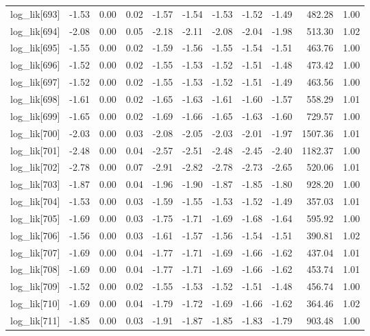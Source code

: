 \begin{table}[ht]
\begin{tabular}{rrrrrrrrrrr}
  log\_lik[693] & -1.53 & 0.00 & 0.02 & -1.57 & -1.54 & -1.53 & -1.52 & -1.49 & 482.28 & 1.00 \\ 
  log\_lik[694] & -2.08 & 0.00 & 0.05 & -2.18 & -2.11 & -2.08 & -2.04 & -1.98 & 513.30 & 1.02 \\ 
  log\_lik[695] & -1.55 & 0.00 & 0.02 & -1.59 & -1.56 & -1.55 & -1.54 & -1.51 & 463.76 & 1.00 \\ 
  log\_lik[696] & -1.52 & 0.00 & 0.02 & -1.55 & -1.53 & -1.52 & -1.51 & -1.48 & 473.42 & 1.00 \\ 
  log\_lik[697] & -1.52 & 0.00 & 0.02 & -1.55 & -1.53 & -1.52 & -1.51 & -1.49 & 463.56 & 1.00 \\ 
  log\_lik[698] & -1.61 & 0.00 & 0.02 & -1.65 & -1.63 & -1.61 & -1.60 & -1.57 & 558.29 & 1.01 \\ 
  log\_lik[699] & -1.65 & 0.00 & 0.02 & -1.69 & -1.66 & -1.65 & -1.63 & -1.60 & 729.57 & 1.00 \\ 
  log\_lik[700] & -2.03 & 0.00 & 0.03 & -2.08 & -2.05 & -2.03 & -2.01 & -1.97 & 1507.36 & 1.01 \\ 
  log\_lik[701] & -2.48 & 0.00 & 0.04 & -2.57 & -2.51 & -2.48 & -2.45 & -2.40 & 1182.37 & 1.00 \\ 
  log\_lik[702] & -2.78 & 0.00 & 0.07 & -2.91 & -2.82 & -2.78 & -2.73 & -2.65 & 520.06 & 1.01 \\ 
  log\_lik[703] & -1.87 & 0.00 & 0.04 & -1.96 & -1.90 & -1.87 & -1.85 & -1.80 & 928.20 & 1.00 \\ 
  log\_lik[704] & -1.53 & 0.00 & 0.03 & -1.59 & -1.55 & -1.53 & -1.52 & -1.49 & 357.03 & 1.01 \\ 
  log\_lik[705] & -1.69 & 0.00 & 0.03 & -1.75 & -1.71 & -1.69 & -1.68 & -1.64 & 595.92 & 1.00 \\ 
  log\_lik[706] & -1.56 & 0.00 & 0.03 & -1.61 & -1.57 & -1.56 & -1.54 & -1.51 & 390.81 & 1.02 \\ 
  log\_lik[707] & -1.69 & 0.00 & 0.04 & -1.77 & -1.71 & -1.69 & -1.66 & -1.62 & 437.04 & 1.01 \\ 
  log\_lik[708] & -1.69 & 0.00 & 0.04 & -1.77 & -1.71 & -1.69 & -1.66 & -1.62 & 453.74 & 1.01 \\ 
  log\_lik[709] & -1.52 & 0.00 & 0.02 & -1.55 & -1.53 & -1.52 & -1.51 & -1.48 & 456.74 & 1.00 \\ 
  log\_lik[710] & -1.69 & 0.00 & 0.04 & -1.79 & -1.72 & -1.69 & -1.66 & -1.62 & 364.46 & 1.02 \\ 
  log\_lik[711] & -1.85 & 0.00 & 0.03 & -1.91 & -1.87 & -1.85 & -1.83 & -1.79 & 903.48 & 1.00 \\ 

\end{tabular}
\end{table}
